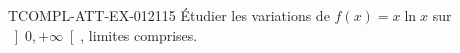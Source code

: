 \begin{exercice}{TCOMPL-ATT-EX-012}{1}{15}
Étudier les variations de $f(x) = x\ln x$ sur $\left]0, +\infty\right[$, limites comprises.

\end{exercice}
